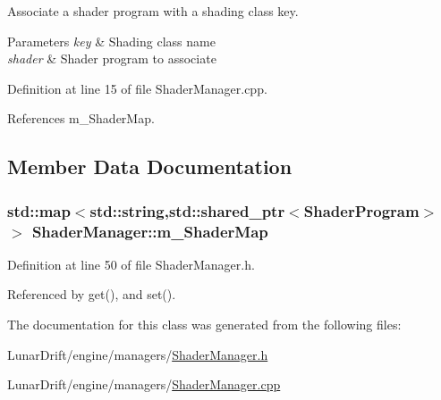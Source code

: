 Associate a shader program with a shading class key. 


\begin{DoxyParams}{Parameters}
{\em key} & Shading class name \\
\hline
{\em shader} & Shader program to associate \\
\hline
\end{DoxyParams}


Definition at line 15 of file Shader\+Manager.\+cpp.



References m\+\_\+\+Shader\+Map.



\subsection{Member Data Documentation}
\subsubsection[{\texorpdfstring{m\+\_\+\+Shader\+Map}{m_ShaderMap}}]{\setlength{\rightskip}{0pt plus 5cm}std\+::map$<$std\+::string,std\+::shared\+\_\+ptr$<${\bf Shader\+Program}$>$ $>$ Shader\+Manager\+::m\+\_\+\+Shader\+Map\hspace{0.3cm}{\ttfamily [private]}}\hypertarget{class_shader_manager_a8b3bab142565af9177794f380db932e7}{}\label{class_shader_manager_a8b3bab142565af9177794f380db932e7}


Definition at line 50 of file Shader\+Manager.\+h.



Referenced by get(), and set().



The documentation for this class was generated from the following files\+:\begin{DoxyCompactItemize}
\item 
Lunar\+Drift/engine/managers/\hyperlink{_shader_manager_8h}{Shader\+Manager.\+h}\item 
Lunar\+Drift/engine/managers/\hyperlink{_shader_manager_8cpp}{Shader\+Manager.\+cpp}\end{DoxyCompactItemize}
